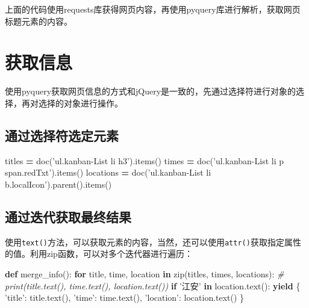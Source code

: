 \documentclass[]{ctexbook}
\newenvironment{Shaded}{\begin{snugshade}}{\end{snugshade}}
\newcommand{\BuiltInTok}[1]{#1}
\newcommand{\CommentTok}[1]{\textcolor[rgb]{0.56,0.35,0.01}{\textit{#1}}}
\newcommand{\ControlFlowTok}[1]{\textcolor[rgb]{0.13,0.29,0.53}{\textbf{#1}}}
\newcommand{\KeywordTok}[1]{\textcolor[rgb]{0.13,0.29,0.53}{\textbf{#1}}}
\newcommand{\NormalTok}[1]{#1}
\newcommand{\OperatorTok}[1]{\textcolor[rgb]{0.81,0.36,0.00}{\textbf{#1}}}
\newcommand{\StringTok}[1]{\textcolor[rgb]{0.31,0.60,0.02}{#1}}
\begin{document}
上面的代码使用requests库获得网页内容，再使用pyquery库进行解析，获取网页标题元素的内容。

\hypertarget{ux83b7ux53d6ux4fe1ux606f}{%
\section{获取信息}\label{ux83b7ux53d6ux4fe1ux606f}}

使用pyquery获取网页信息的方式和jQuery是一致的，先通过选择符进行对象的选择，再对选择的对象进行操作。

\hypertarget{ux901aux8fc7ux9009ux62e9ux7b26ux9009ux5b9aux5143ux7d20}{%
\subsection{通过选择符选定元素}\label{ux901aux8fc7ux9009ux62e9ux7b26ux9009ux5b9aux5143ux7d20}}

\begin{Shaded}
\begin{Highlighting}[]
\NormalTok{titles }\OperatorTok{=}\NormalTok{ doc(}\StringTok{'ul.kanban-List li h3'}\NormalTok{).items()}
\NormalTok{times }\OperatorTok{=}\NormalTok{ doc(}\StringTok{'ul.kanban-List li p span.redTxt'}\NormalTok{).items()}
\NormalTok{locations }\OperatorTok{=}\NormalTok{ doc(}\StringTok{'ul.kanban-List li b.localIcon'}\NormalTok{).parent().items()}
\end{Highlighting}
\end{Shaded}

\hypertarget{ux901aux8fc7ux8fedux4ee3ux83b7ux53d6ux6700ux7ec8ux7ed3ux679c}{%
\subsection{通过迭代获取最终结果}\label{ux901aux8fc7ux8fedux4ee3ux83b7ux53d6ux6700ux7ec8ux7ed3ux679c}}

使用\texttt{text()}方法，可以获取元素的内容，当然，还可以使用\texttt{attr()}获取指定属性的值。利用zip函数，可以对多个迭代器进行遍历：

\begin{Shaded}
\begin{Highlighting}[]
\KeywordTok{def}\NormalTok{ merge_info():}
    \ControlFlowTok{for}\NormalTok{ title, time, location }\KeywordTok{in} \BuiltInTok{zip}\NormalTok{(titles, times, locations):}
        \CommentTok{# print(title.text(), time.text(), location.text())}
        \ControlFlowTok{if} \StringTok{'江安'} \KeywordTok{in}\NormalTok{ location.text():}
            \ControlFlowTok{yield}\NormalTok{ \{}
                \StringTok{'title'}\NormalTok{: title.text(),}
                \StringTok{'time'}\NormalTok{: time.text(),}
                \StringTok{'location'}\NormalTok{: location.text()}
\NormalTok{            \}}
\end{Highlighting}
\end{Shaded}
\end{document}
